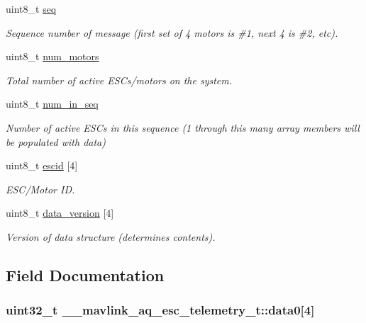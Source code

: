 \begin{DoxyCompactItemize}
uint8\+\_\+t \hyperlink{struct____mavlink__aq__esc__telemetry__t_ab57abc6183bead136f6198e15f97134b}{seq}
\begin{DoxyCompactList}\small\item\em Sequence number of message (first set of 4 motors is \#1, next 4 is \#2, etc). \end{DoxyCompactList}\item 
uint8\+\_\+t \hyperlink{struct____mavlink__aq__esc__telemetry__t_ad1fcb50c88938466376d26ee77a1093b}{num\+\_\+motors}
\begin{DoxyCompactList}\small\item\em Total number of active E\+S\+Cs/motors on the system. \end{DoxyCompactList}\item 
uint8\+\_\+t \hyperlink{struct____mavlink__aq__esc__telemetry__t_ad480b6bb106d4ae8507ad5798c5fc67a}{num\+\_\+in\+\_\+seq}
\begin{DoxyCompactList}\small\item\em Number of active E\+S\+Cs in this sequence (1 through this many array members will be populated with data) \end{DoxyCompactList}\item 
uint8\+\_\+t \hyperlink{struct____mavlink__aq__esc__telemetry__t_adfcfbcce4213bf8e41d71c4b1ec21284}{escid} \mbox{[}4\mbox{]}
\begin{DoxyCompactList}\small\item\em E\+S\+C/\+Motor I\+D. \end{DoxyCompactList}\item 
uint8\+\_\+t \hyperlink{struct____mavlink__aq__esc__telemetry__t_a52e85169894e5ebdb2389dab80d3cff9}{data\+\_\+version} \mbox{[}4\mbox{]}
\begin{DoxyCompactList}\small\item\em Version of data structure (determines contents). \end{DoxyCompactList}\end{DoxyCompactItemize}


\subsection{Field Documentation}
\hypertarget{struct____mavlink__aq__esc__telemetry__t_ad6b56c43abdf775da1a02ad64ca54776}{
\subsubsection[{data0}]{\setlength{\rightskip}{0pt plus 5cm}uint32\+\_\+t \+\_\+\+\_\+mavlink\+\_\+aq\+\_\+esc\+\_\+telemetry\+\_\+t\+::data0\mbox{[}4\mbox{]}}}\label{struct____mavlink__aq__esc__telemetry__t_ad6b56c43abdf775da1a02ad64ca54776}


